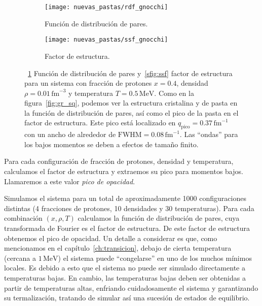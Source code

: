 \begin{figure}  \centering
  \begin{subfigure}[h!]{0.4\columnwidth}
    \centering
    \texttt{[image: nuevas\_pastas/rdf\_gnocchi]}
    \caption{Función de distribución de pares.}
      \label{sfig:gr_gnocchi}
  \end{subfigure}
  \begin{subfigure}[h!]{0.4\columnwidth}
    \centering
    \texttt{[image: nuevas\_pastas/ssf\_gnocchi]}
    \caption{Factor de estructura.}
      \label{sfig:ssf_gnocchi}
  \end{subfigure}
  \caption{~\ref{sfig:gr_gnocchi} Función de distribución de pares y~\ref{sfig:ssf} factor de estructura para un sistema con fracción de protones $x=0.4$, densidad $\rho=0.01\,\text{fm}^{-3}$ y temperatura $T=0.5\,\text{MeV}$.
    Como en la figura~\ref{fig:gr_sq}, podemos ver la estructura cristalina y de pasta en la función de distribución de pares, así como el pico de la pasta en el factor de estructura.
    Este pico está localizado en $q_\text{pico} = 0.37\,\text{fm}^{-1}$ con un ancho de alrededor de $\text{FWHM} = 0.08\,\text{fm}^{-1}$.
    Las ``ondas'' para los bajos momentos se deben a efectos de tamaño finito.}
  \label{fig:gr_sq_gnocchi}
\end{figure}


Para cada configuración de fracción de protones, densidad y temperatura, calculamos el factor de estructura y extraemos su pico para momentos bajos.
Llamaremos a este valor \emph{pico de opacidad}.

Simulamos el sistema para un total de aproximadamente 1000 configuraciones distintas (4 fracciones de protones, 10 densidades y 30 temperaturas).
Para cada combinación $(x, \rho, T)$ calculamos la función de distribución de pares, cuya transformada de Fourier es el factor de estructura.
De este factor de estructura obtenemos el pico de opacidad.
Un detalle a considerar es que, como mencionamos en el capítulo~\ref{ch:transicion}, debajo de cierta temperatura (cercana a $1\,\text{MeV}$) el sistema puede ``congelarse'' en uno de los muchos mínimos locales.
Es debido a esto que el sistema no puede ser simulado directamente a temperaturas bajas.
En cambio, las temperaturas bajas deben ser obtenidas a partir de temperaturas altas, enfriando cuidadosamente el sistema y garantizando su termalización, tratando de simular así una sucesión de estados de equilibrio.

